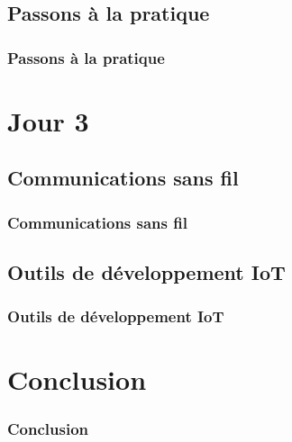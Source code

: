 \documentclass[aspectratio=169,utf8]{beamer}
\begin{document}
\subsection{Passons à la pratique}

\begin{frame}
  \frametitle{Passons à la pratique}
\end{frame}

\section{Jour 3}

\subsection{Communications sans fil}

\begin{frame}
  \frametitle{Communications sans fil}
\end{frame}

\subsection{Outils de développement IoT}

\begin{frame}
  \frametitle{Outils de développement IoT}
\end{frame}

\section{Conclusion}

\begin{frame}
  \frametitle{Conclusion}
\end{frame}
\end{document}
